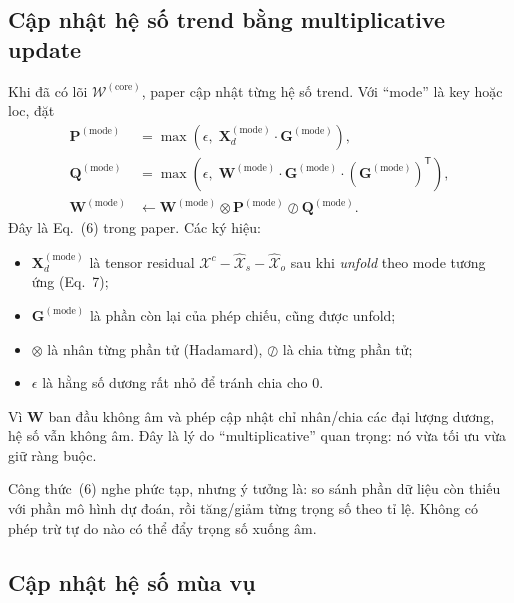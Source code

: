 \subsection{Cập nhật hệ số trend bằng multiplicative update}

Khi đã có lõi $\mathcal{W}^{(\mathrm{core})}$, paper cập nhật từng hệ số trend. Với
``mode'' là key hoặc loc, đặt
\begin{align}
  \mathbf{P}^{(\mathrm{mode})}
  &=\max\!\left(\epsilon,\;
    \mathbf{X}_d^{(\mathrm{mode})}\cdot\mathbf{G}^{(\mathrm{mode})}
   \right), \label{eq:w-p}\\
  \mathbf{Q}^{(\mathrm{mode})}
  &=\max\!\left(\epsilon,\;
    \mathbf{W}^{(\mathrm{mode})}\cdot\mathbf{G}^{(\mathrm{mode})}
    \cdot(\mathbf{G}^{(\mathrm{mode})})^{\mathsf T}
   \right), \label{eq:w-q}\\
  \mathbf{W}^{(\mathrm{mode})}
  &\leftarrow
    \mathbf{W}^{(\mathrm{mode})}
    \otimes\mathbf{P}^{(\mathrm{mode})}
    \oslash\mathbf{Q}^{(\mathrm{mode})}.
  \label{eq:multiplicative}
\end{align}
Đây là Eq.~(6) trong paper. Các ký hiệu:
\begin{itemize}
  \item $\mathbf{X}_d^{(\mathrm{mode})}$ là tensor residual
        $\mathcal{X}^{c}-\widehat{\mathcal{X}}_s-\widehat{\mathcal{X}}_o$ sau khi \emph{unfold}
        theo mode tương ứng (Eq.~7);
  \item $\mathbf{G}^{(\mathrm{mode})}$ là phần còn lại của phép chiếu, cũng được unfold;
  \item $\otimes$ là nhân từng phần tử (Hadamard), $\oslash$ là chia từng phần tử;
  \item $\epsilon$ là hằng số dương rất nhỏ để tránh chia cho 0.
\end{itemize}
Vì $\mathbf{W}$ ban đầu không âm và phép cập nhật chỉ nhân/chia các đại lượng dương, hệ số vẫn
không âm. Đây là lý do ``multiplicative'' quan trọng: nó vừa tối ưu vừa giữ ràng buộc.

\begin{plainwords}
Công thức~(6) nghe phức tạp, nhưng ý tưởng là: so sánh phần dữ liệu còn thiếu với phần mô hình
dự đoán, rồi tăng/giảm từng trọng số theo tỉ lệ. Không có phép trừ tự do nào có thể đẩy trọng số
xuống âm.
\end{plainwords}

\subsection{Cập nhật hệ số mùa vụ}


